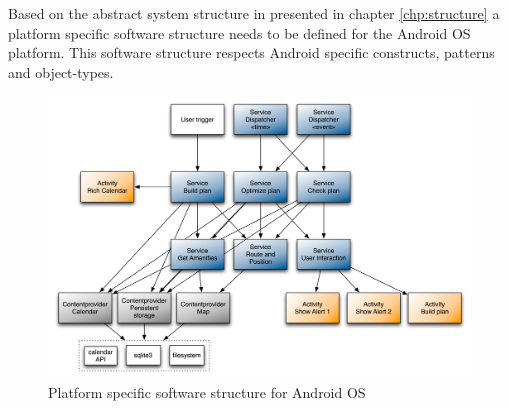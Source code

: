 Based on the abstract system structure in presented in chapter \ref{chp:structure} a platform specific software structure needs to be defined for the Android OS platform. This software structure respects Android specific constructs, patterns and object-types.\\
\begin{figure}[h!]
\centering
\includegraphics[width=16cm]{pics/android_structure.png}
\caption{Platform specific software structure for Android OS}
\label{android_strucutre}
\end{figure}